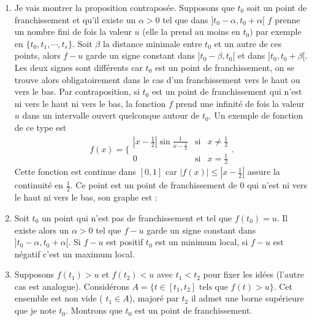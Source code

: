 \begin{enumerate}
  \item  Je vais montrer la proposition contrapos{\'e}e. Supposons que $t_{0}$ soit un point de franchissement et qu'il existe un $\alpha >0$ tel que dans
  $] t_{0}-\alpha ,t_{0}+\alpha [ $ $f$ prenne un nombre fini de fois la valeur $u$ (elle la prend au moins en $t_{0})$ par exemple en $\{ t_{0},t_{1},\cdots ,t_{s}\}$.
  Soit $\beta $ la distance minimale entre $t_{0}$ et un autre de ces points, alors $f-u$ garde un signe constant dans $] t_{0}-\beta ,t_{0}[ $ et dans $]t_{0},t_{0}+\beta [ $.
  Les deux signes sont diff{\'e}rents car $t_{0}$ est un point de franchissement, on se trouve alors obligatoirement dans le cas d'un franchissement vers le haut ou vers le bas.\newline
  Par contraposition, si $t_{0}$ est un point de franchissement qui n'est ni vers le haut ni vers le bas, la fonction $f$ prend une infinit{\'e} de fois la valeur $u$ dans un
  intervalle ouvert quelconque autour de $t_{0}$. Un exemple de fonction de ce type est
\[
f(x)=\{
\begin{array}{ccc}
| x-\frac{1}{2}| \sin \frac{1}{x-\frac{1}{2}} & \text{si} & x\neq
\frac{1}{2} \\
0 & \text{si} & x=\frac{1}{2}
\end{array}
.
\]
Cette fonction est continue dans $[ 0,1] $ car $| f(x)| \leq | x-\frac{1}{2}| $ assure la continuit{\'e} en $\frac{1}{2}.$ Ce point est un point de franchissement de $0$ qui
n'est ni vers le haut ni vers le bas, son graphe est :
\begin{floatingfigure}{5cm}
\end{floatingfigure}

  \item  Soit $t_{0}$ un point qui n'est pas de franchissement et tel que $f(t_{0})=u$. Il existe alors un $\alpha >0$ tel que $f-u$ garde un
signe constant dans $] t_{0}-\alpha ,t_{0}+\alpha [ $. Si $f-u$ est positif $t_{0}$ est un minimum local, si $f-u$ est n{\'e}gatif c'est un maximum local.

  \item  Supposons $f(t_{1})>u$ et $f(t_{2})<u$ avec $t_{1}<t_{2}$ pour fixer les id{\'e}es (l'autre cas est analogue). Consid{\'e}rons
$A=\{ t\in [ t_{1},t_{2}] \text{ tels que }f(t)>u\} $. Cet ensemble est non vide ( $t_{1}\in A$), major{\'e} par $t_{2}$ il admet une borne sup{\'e}rieure que je note $t_{0}$. Montrons que
$t_{0}$ est un point de franchissement.


\end{enumerate}
